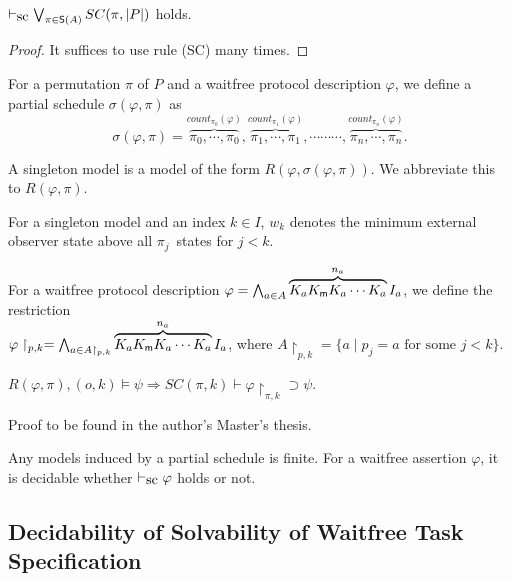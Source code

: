   \begin{lemma}
   \label{perm}
   $\vdash_{\mbox{\rm sc}} \bigvee_{\pi\in \mathsf S(A)} SC(\pi, |P|)$ holds.
  \end{lemma}
  \begin{proof}
   It suffices to use rule (SC) many times.
  \end{proof}

  \begin{definition}
   For a permutation $\pi$ of $P$ and a waitfree protocol description $\varphi$, we
   define a partial schedule $\sigma(\varphi, \pi)$ as
   \[
   \sigma(\varphi, \pi) =
   \overbrace{\pi_0, \cdots, \pi_0}^{count_{\pi_0}(\varphi)},
   \overbrace{\pi_1, \cdots, \pi_1}^{count_{\pi_1}(\varphi)},
   \cdots \cdots
   \cdots,
   \overbrace{\pi_n,\cdots, \pi_n}^{count_{\pi_n}(\varphi)}.
   \]
  \end{definition}

  \begin{definition}
   A singleton model is a model of the form $R(\varphi, \sigma(\varphi,
   \pi))$. We abbreviate this to $R(\varphi, \pi)$.

   For a singleton model and an index $k\in I$, $w_k$ denotes the minimum external
   observer state above all $\pi_j$~states for $j< k$.
  \end{definition}

  \begin{definition}
   For a waitfree protocol description $\varphi = \bigwedge_{a\in A}
   \overbrace{K_a K_{\sf m} K_a \cdots K_a}^{n_a}
   I_a$, we define the restriction \\
   $\varphi\restriction_{p,k} =
   \bigwedge_{a\in A\restriction_{p,k}} \overbrace{K_a K_{\sf m} K_a \cdots K_a}^{n_a} I_a$,
   where $A\restriction_{p,k} = \{a\mid p_j = a \mbox{ for some
   } j<
   k\}$.
  \end{definition}

  \begin{lemma}
   \label{stronger}
   $R(\varphi, \pi), (o,k)\models \psi\Longrightarrow SC(\pi, k)\vdash
   \varphi\restriction_{\pi,k}\supset\psi$.
  \end{lemma}
  Proof to be found in the author's Master's thesis.

  Any models induced by a partial schedule is finite.  For a waitfree assertion $\varphi$,
  it is decidable whether $\vdash_{\mbox{\rm sc}} \varphi$ holds or not.


  \subsection{Decidability of Solvability of Waitfree Task Specification}

